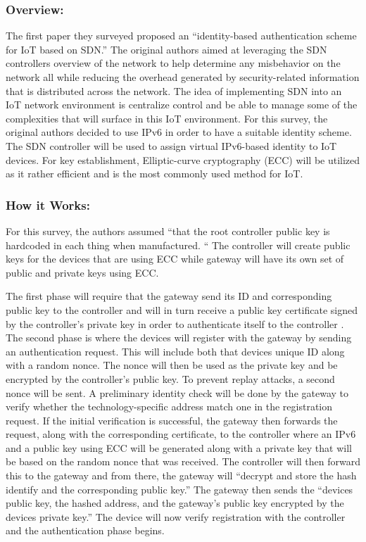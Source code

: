 \subsubsection {Overview:}

The first paper they surveyed proposed an “identity-based authentication scheme for IoT based on SDN.” \cite {kalkan2017securing} The original authors aimed at leveraging the SDN controllers overview of the network to help determine any misbehavior on the network all while reducing the overhead generated by security-related information that is distributed across the network. The idea of implementing SDN into an IoT network environment is centralize control and be able to manage some of the complexities that will surface in this IoT environment. For this survey, the original authors decided to use IPv6 in order to have a suitable identity scheme. The SDN controller will be used to assign virtual IPv6-based identity to IoT devices. \cite {salman2016identity} For key establishment, Elliptic-curve cryptography (ECC) will be utilized as it rather efficient and is the most commonly used method for IoT. 

\subsubsection {How it Works:}

For this survey, the authors assumed “that the root controller public key is hardcoded in each thing when manufactured. “\cite {salman2016identity} The controller will create public keys for the devices that are using ECC while gateway will have its own set of public and private keys using ECC. 

\smallskip

The first phase will require that the gateway send its ID and corresponding public key to the controller and will in turn receive a public key certificate signed by the controller’s private key in order to authenticate itself to the controller \cite {salman2016identity}. The second phase is where the devices will register with the gateway by sending an authentication request. This will include both that devices unique ID along with a random nonce. The nonce will then be used as the private key and be encrypted by the controller’s public key. To prevent replay attacks, a second nonce will be sent. A preliminary identity check will be done by the gateway to verify whether the technology-specific address match one in the registration request. \cite {salman2016identity} If the initial verification is successful, the gateway then forwards the request, along with the corresponding certificate, to the controller where an IPv6 and a public key using ECC will be generated along with a private key that will be based on the random nonce that was received. The controller will then forward this to the gateway and from there, the gateway will “decrypt and store the hash identify and the corresponding public key.” \cite {salman2016identity} The gateway then sends the “devices public key, the hashed address, and the gateway’s public key encrypted by the devices private key.” \cite {salman2016identity} The device will now verify registration with the controller and the authentication phase begins.

